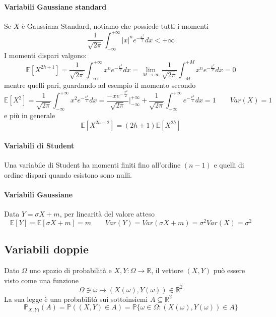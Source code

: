 \paragraph{Variabili Gaussiane standard}
Se $X$ è Gaussiana Standard, notiamo che possiede tutti i momenti
\begin{equation}
	\frac{1}{\sqrt{2\pi}}\int_{-\infty}^{+\infty}\lvert x\rvert^ne^{-\frac{x^2}{2}} dx < +\infty
\end{equation}
I momenti dispari valgono:
\begin{equation}
	\mathbb{E}[X^{2h+1}] = \frac{1}{\sqrt{2\pi}}\int_{-\infty}^{+\infty}x^ne^{-\frac{x^2}{2}}dx = \lim_{M \to \infty}\frac{1}{\sqrt{2\pi}}\int_{-M}^{+M}x^ne^{-\frac{x^2}{2}}dx=0
\end{equation}
mentre quelli pari, guardando ad esempio il momento secondo
\begin{equation}
	\mathbb{E}[X^2]=\frac{1}{\sqrt{2\pi}}\int_{-\infty}^{+\infty}x^2e^{-\frac{x^2}{2}}dx = \frac{-xe^{-\frac{x^2}{2}}}{\sqrt{2\pi}}\bigg\vert^{+\infty}_{-\infty}+\frac{1}{\sqrt{2\pi}}\int_{-\infty}^{+\infty}e^{-\frac{x^2}{2}}dx = 1 \quad\quad Var(X)=1
\end{equation}
e più in generale
\begin{equation}
	\mathbb{E}[X^{2h+2}]=(2h+1)\mathbb{E}[X^{2h}]
\end{equation}

\paragraph{Variabili di Student}
Una variabile di Student ha momenti finiti fino all'ordine $(n-1)$ e quelli di ordine dispari quando esistono sono nulli.

\paragraph{Variabili Gaussiane}
Data $Y=\sigma X + m$, per linearità del valore atteso
\begin{equation}
	\mathbb{E}[Y] = \mathbb{E}[\sigma X + m] = m \quad\quad Var(Y)=Var(\sigma X +m)=\sigma^2Var(X) = \sigma^2
\end{equation}

\subsection{Variabili doppie}
Dato $\Omega$ uno spazio di probabilità e $X,Y:\Omega \to \mathbb{R}$, il vettore $(X,Y)$ può essere visto come una funzione
\begin{equation}
	\Omega \ni \omega \mapsto (X(\omega),Y(\omega))\in \mathbb{R}^2
\end{equation}
La sua legge è una probabilità sui sottoinsiemi $A \subseteq \mathbb{R}^2$
\begin{equation}
	\mathbb{P}_{X,Y)}(A) = \mathbb{P}((X,Y) \in A) = \mathbb{P}\{\omega \in \Omega : (X(\omega), Y(\omega)) \in A\}
\end{equation}

